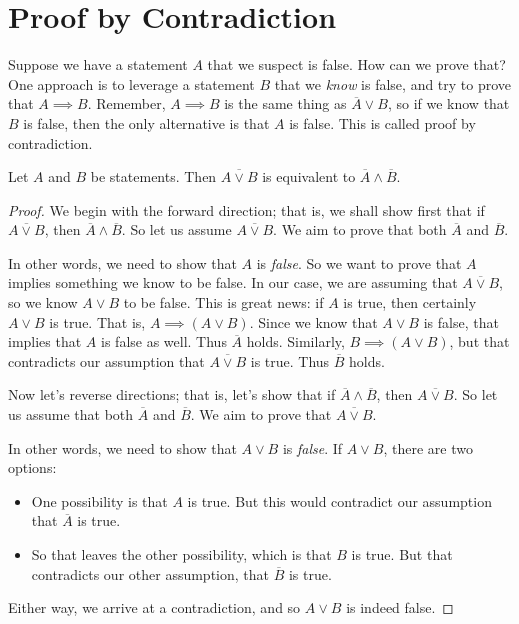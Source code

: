 \documentclass[11pt,dvipsnames]{book}
\numberwithin{figure}{section} %
\numberwithin{table}{section} %
\begin{document}
\section{Proof by Contradiction}%
\label{proofbycontradiction}

Suppose we have a statement $A$ that we suspect is false.
How can we prove that?
One approach is to leverage a statement $B$ that we \emph{know} is false, and try to prove that $A \implies B$.
Remember, $A \implies B$ is the same thing as $\overline{A} \vee B$,
so if we know that $B$ is false, then the only alternative is that $A$ is false.
This is called proof by contradiction.

\begin{theorem}
Let $A$ and $B$ be statements.
Then $\overline{A \vee B}$ is equivalent to $\overline{A} \wedge \overline{B}$.
\end{theorem}

\begin{proof}
We begin with the forward direction;
that is, we shall show first that if $\overline{A \vee B}$, then $\overline{A} \wedge \overline{B}$.
So let us assume $\overline{A \vee B}$.
We aim to prove that both $\overline{A}$ and $\overline{B}$.

In other words, we need to show that $A$ is \emph{false}.
So we want to prove that $A$ implies something we know to be false.
In our case, we are assuming that $\overline{A \vee B}$, so we know $A \vee B$ to be false.
This is great news: if $A$ is true, then certainly $A \vee B$ is true.
That is, $A \implies (A \vee B)$.
Since we know that $A \vee B$ is false, that implies that $A$ is false as well.
Thus $\overline{A}$ holds.
Similarly, $B \implies (A \vee B)$, but that contradicts our assumption that $\overline{A \vee B}$ is true.
Thus $\overline{B}$ holds.

Now let's reverse directions;
that is, let's show that if $\overline{A} \wedge \overline{B}$, then $\overline{A \vee B}$.
So let us assume that both $\overline{A}$ and $\overline{B}$.
We aim to prove that $\overline{A \vee B}$.

In other words, we need to show that $A \vee B$ is \emph{false}.
If $A \vee B$, there are two options:
\begin{itemize}
    \item One possibility is that $A$ is true. But this would contradict our assumption that $\overline{A}$ is true.
    \item So that leaves the other possibility, which is that $B$ is true. But that contradicts our other assumption, that $\overline{B}$ is true.
\end{itemize}
Either way, we arrive at a contradiction, and so $A\vee B$ is indeed false.
\end{proof}
\end{document}
